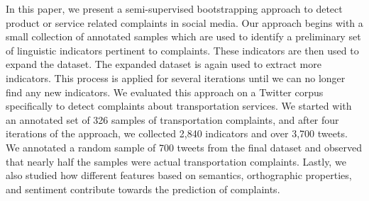 In this paper, we present a semi-supervised bootstrapping approach to detect product or service related complaints in social media. Our approach begins with a small collection of annotated samples which are used to identify a preliminary set of linguistic indicators pertinent to complaints. These indicators are then used to expand the dataset. The expanded dataset is again used to extract more indicators. This process is applied for several iterations until we can no longer find any new indicators. We evaluated this approach on a Twitter corpus specifically to detect complaints about transportation services. We started with an annotated set of 326 samples of transportation complaints, and after four iterations of the approach, we collected 2,840 indicators and over 3,700 tweets. We annotated a random sample of 700 tweets from the final dataset and observed that nearly half the samples were actual transportation complaints. Lastly, we also studied how different features based on semantics, orthographic properties, and sentiment contribute towards the prediction of complaints.
